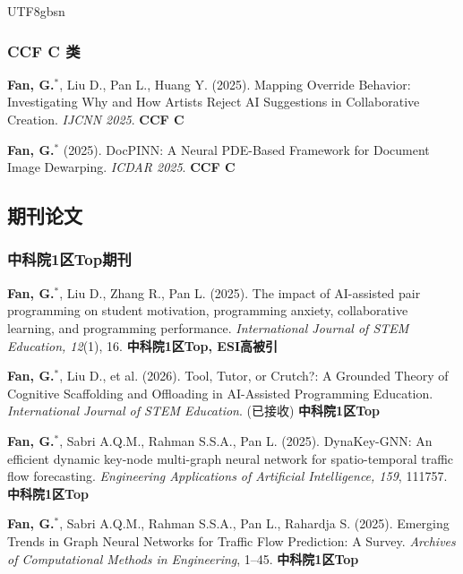 \documentclass[a4paper,10pt]{article}
\newcommand{\pubitem}[1]{\item #1}
\begin{document}
\begin{CJK*}{UTF8}{gbsn}
\subsubsection*{CCF C 类}

\begin{enumerate}[label={[C\arabic*]}, resume]
    \pubitem{\textbf{Fan, G.}$^*$, Liu D., Pan L., Huang Y. (2025). Mapping Override Behavior: Investigating Why and How Artists Reject AI Suggestions in Collaborative Creation. \textit{IJCNN 2025}. \textbf{CCF C}}
    
    \pubitem{\textbf{Fan, G.}$^*$ (2025). DocPINN: A Neural PDE-Based Framework for Document Image Dewarping. \textit{ICDAR 2025}. \textbf{CCF C}}
\end{enumerate}

\subsection*{期刊论文}

\subsubsection*{中科院1区Top期刊}

\begin{enumerate}[label={[J\arabic*]}]
    \pubitem{\textbf{Fan, G.}$^*$, Liu D., Zhang R., Pan L. (2025). The impact of AI-assisted pair programming on student motivation, programming anxiety, collaborative learning, and programming performance. \textit{International Journal of STEM Education, 12}(1), 16. \textbf{中科院1区Top, ESI高被引}}
    
    \pubitem{\textbf{Fan, G.}$^*$, Liu D., et al. (2026). Tool, Tutor, or Crutch?: A Grounded Theory of Cognitive Scaffolding and Offloading in AI-Assisted Programming Education. \textit{International Journal of STEM Education}. (已接收) \textbf{中科院1区Top}}
    
    \pubitem{\textbf{Fan, G.}$^*$, Sabri A.Q.M., Rahman S.S.A., Pan L. (2025). DynaKey-GNN: An efficient dynamic key-node multi-graph neural network for spatio-temporal traffic flow forecasting. \textit{Engineering Applications of Artificial Intelligence, 159}, 111757. \textbf{中科院1区Top}}
    
    \pubitem{\textbf{Fan, G.}$^*$, Sabri A.Q.M., Rahman S.S.A., Pan L., Rahardja S. (2025). Emerging Trends in Graph Neural Networks for Traffic Flow Prediction: A Survey. \textit{Archives of Computational Methods in Engineering}, 1--45. \textbf{中科院1区Top}}
    

\end{enumerate}
\end{CJK*}
\end{document}
